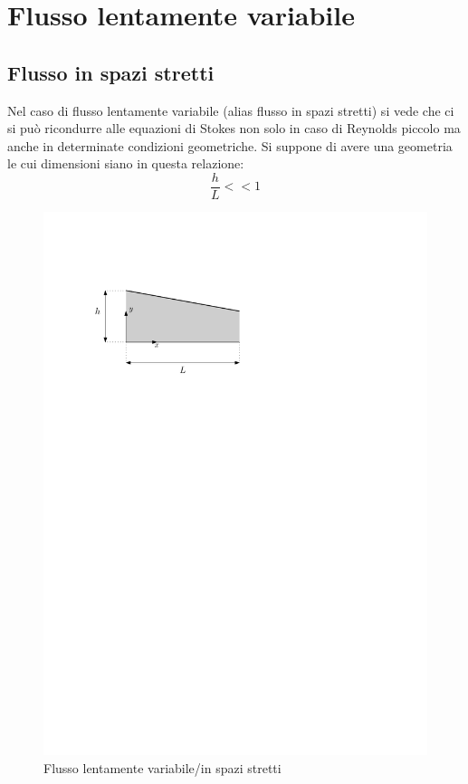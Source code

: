 %
\section{Flusso lentamente variabile}
\subsection{Flusso in spazi stretti}
Nel caso di flusso lentamente variabile (alias flusso in spazi stretti) si vede che ci si può ricondurre alle equazioni di Stokes non solo in caso di Reynolds piccolo ma anche in determinate condizioni geometriche.
Si suppone di avere una geometria le cui dimensioni siano in questa relazione:
%
	\begin{equation*}
		\frac{h}{L} << 1
	\end{equation*}
%
%
	\begin{figure}[ht]
		\includegraphics[scale=0.85]{./6.2 Flusso lentamente variabile/6.2-1}
		\centering
		\caption{Flusso lentamente variabile/in spazi stretti}
	\end{figure}
